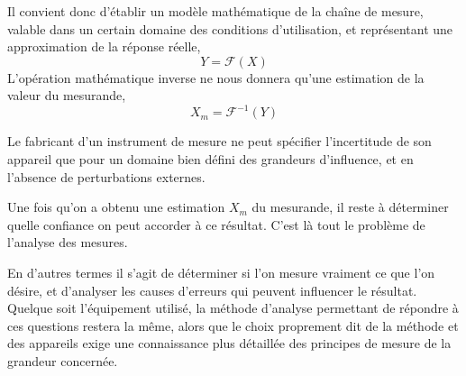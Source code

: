 Il convient donc d'établir un modèle mathématique de la chaîne de mesure, valable dans un certain domaine des conditions d'utilisation, et représentant une approximation de la réponse réelle,
\begin{equation}
Y=\mathcal{F}(X)
\end{equation}
L'opération mathématique inverse ne nous donnera qu'une estimation de la valeur du mesurande,
\begin{equation}
X_m=\mathcal{F}^{-1}(Y)
\end{equation}

\begin{center}
\end{center}

\begin{center}
\end{center}
Le fabricant d'un instrument de mesure ne peut spécifier l'incertitude de son appareil que pour un domaine bien défini des grandeurs d'influence, et en l'absence de perturbations externes.

Une fois qu'on a obtenu une estimation $X_m$ du mesurande, il reste à déterminer quelle confiance on peut accorder à ce résultat. C'est là tout le problème de l'analyse des mesures.
\begin{center}
\end{center}

En d'autres termes il s'agit de déterminer si l'on mesure vraiment ce que l'on désire, et d'analyser les causes d'erreurs qui peuvent influencer le résultat. Quelque soit l'équipement utilisé, la méthode d'analyse permettant de répondre à ces questions restera la même, alors que le choix proprement dit de la méthode et des appareils exige une connaissance plus détaillée des principes de mesure de la grandeur concernée.

